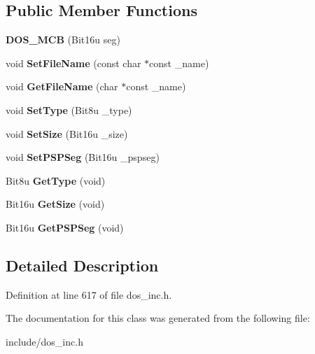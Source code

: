\subsection*{Public Member Functions}
\begin{DoxyCompactItemize}
\item 
\hypertarget{classDOS__MCB_a0b1bf404720604aafd755212f8d06ffc}{{\bfseries D\-O\-S\-\_\-\-M\-C\-B} (Bit16u seg)}\label{classDOS__MCB_a0b1bf404720604aafd755212f8d06ffc}

\item 
\hypertarget{classDOS__MCB_adb5a8fae4d7777501c48f6fc783da385}{void {\bfseries Set\-File\-Name} (const char $\ast$const \-\_\-name)}\label{classDOS__MCB_adb5a8fae4d7777501c48f6fc783da385}

\item 
\hypertarget{classDOS__MCB_a9b76d148117232e7c4dceb0a7a990d3d}{void {\bfseries Get\-File\-Name} (char $\ast$const \-\_\-name)}\label{classDOS__MCB_a9b76d148117232e7c4dceb0a7a990d3d}

\item 
\hypertarget{classDOS__MCB_ab9545960540afa53f5ead1d49a48890e}{void {\bfseries Set\-Type} (Bit8u \-\_\-type)}\label{classDOS__MCB_ab9545960540afa53f5ead1d49a48890e}

\item 
\hypertarget{classDOS__MCB_a524e972434b1f0b57435a95d6dddd4b5}{void {\bfseries Set\-Size} (Bit16u \-\_\-size)}\label{classDOS__MCB_a524e972434b1f0b57435a95d6dddd4b5}

\item 
\hypertarget{classDOS__MCB_a4a0d73cdef5da789a59a2e141d69b0b6}{void {\bfseries Set\-P\-S\-P\-Seg} (Bit16u \-\_\-pspseg)}\label{classDOS__MCB_a4a0d73cdef5da789a59a2e141d69b0b6}

\item 
\hypertarget{classDOS__MCB_ab5aca8f3fe000215dd7a563a17a990f9}{Bit8u {\bfseries Get\-Type} (void)}\label{classDOS__MCB_ab5aca8f3fe000215dd7a563a17a990f9}

\item 
\hypertarget{classDOS__MCB_a133271b66d178a643a8090c2b3a8784d}{Bit16u {\bfseries Get\-Size} (void)}\label{classDOS__MCB_a133271b66d178a643a8090c2b3a8784d}

\item 
\hypertarget{classDOS__MCB_a3e8986ea9546d0d914202a41bd774288}{Bit16u {\bfseries Get\-P\-S\-P\-Seg} (void)}\label{classDOS__MCB_a3e8986ea9546d0d914202a41bd774288}

\end{DoxyCompactItemize}


\subsection{Detailed Description}


Definition at line 617 of file dos\-\_\-inc.\-h.



The documentation for this class was generated from the following file\-:\begin{DoxyCompactItemize}
\item 
include/dos\-\_\-inc.\-h\end{DoxyCompactItemize}
